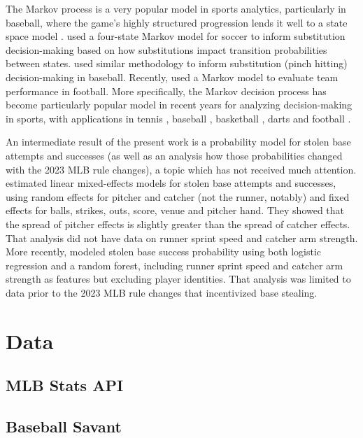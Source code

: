 \documentclass{article}
\begin{document}
    The Markov process is a very popular model in sports analytics, particularly in baseball, where the game's highly structured progression lends it well to a state space model \citep{bukiet_markov_1997}. \cite{hirotsu_using_2002} used a four-state Markov model for soccer to inform substitution decision-making based on how substitutions impact transition probabilities between states. \cite{hirotsu_markov_2003} used similar methodology to inform substitution (pinch hitting) decision-making in baseball. Recently, \cite{chan_points_2021} used a Markov model to evaluate team performance in football. More specifically, the Markov decision process has become particularly popular model in recent years for analyzing decision-making in sports, with applications in tennis \citep{nadimpalli_when_2013}, baseball \citep{hirotsu_using_2019}, basketball \citep{sandholtz_markov_2020}, darts \citep{baird_optimising_2020} and football \citep{biro_reinforcement_2022}.

    An intermediate result of the present work is a probability model for stolen base attempts and successes (as well as an analysis how those probabilities changed with the 2023 MLB rule changes), a topic which has not received much attention. \cite{loughin_assessing_2008} estimated linear mixed-effects models for stolen base attempts and successes, using random effects for pitcher and catcher (not the runner, notably) and fixed effects for balls, strikes, outs, score, venue and pitcher hand. They showed that the spread of pitcher effects is slightly greater than the spread of catcher effects. That analysis did not have data on runner sprint speed and catcher arm strength. More recently, \cite{stanley_modeling_2023} modeled stolen base success probability using both logistic regression and a random forest, including runner sprint speed and catcher arm strength as features but excluding player identities. That analysis was limited to data prior to the 2023 MLB rule changes that incentivized base stealing.

  \section{Data}

    \subsection{MLB Stats API}

    \subsection{Baseball Savant}
\end{document}

